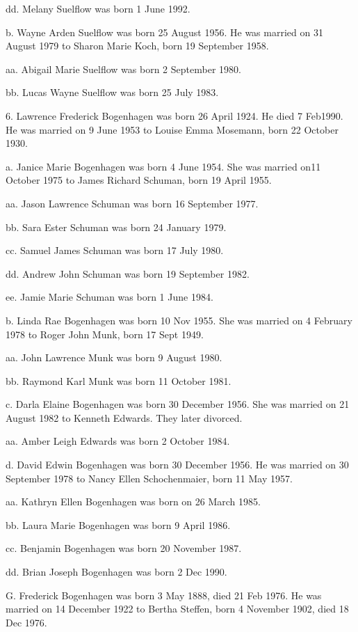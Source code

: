 \documentclass[a4paper]{article}
\begin{document}
dd. Melany Suelflow was born 1 June 1992.

b. Wayne Arden Suelflow was born 25 August 1956.  He was married on 31 August 1979 to Sharon Marie Koch, born 19 September 1958.

aa. Abigail Marie Suelflow was born 2 September 1980.

bb. Lucas Wayne Suelflow was born 25 July 1983.

6. Lawrence Frederick Bogenhagen was born 26 April 1924.  He died 7 Feb1990. He was married on 9 June 1953 to Louise Emma Mosemann, born 22 October 1930.

a. Janice Marie Bogenhagen was born 4 June 1954.  She was married on11 October 1975 to James Richard Schuman,  born 19 April 1955.

aa. Jason Lawrence Schuman was born 16 September 1977.

bb. Sara Ester Schuman was born 24 January 1979.

cc. Samuel James Schuman was born 17 July 1980. 

dd. Andrew John Schuman was born 19 September 1982.

ee. Jamie Marie Schuman was born 1 June 1984. 

b. Linda Rae Bogenhagen was born 10 Nov 1955.  She was married on 4 February 1978 to Roger John Munk, born 17 Sept 1949.

aa. John Lawrence Munk was born 9 August 1980.

bb. Raymond Karl Munk was born 11 October 1981.

c. Darla Elaine Bogenhagen was born 30 December 1956. She was married on 21 August 1982 to Kenneth Edwards.  They later divorced.

aa. Amber Leigh Edwards was born 2 October 1984.

d. David Edwin Bogenhagen was born 30 December 1956.  He was married on 30 September 1978 to Nancy Ellen Schochenmaier, born 11 May 1957.

aa. Kathryn Ellen Bogenhagen was born on 26 March 1985.

bb. Laura Marie Bogenhagen was born 9 April 1986.

cc. Benjamin Bogenhagen was born 20 November 1987.

dd. Brian Joseph Bogenhagen was born 2 Dec 1990.

G. Frederick Bogenhagen was born 3 May 1888, died 21 Feb 1976.  He was married on 14 December 1922 to Bertha Steffen, born 4 November 1902, died 18 Dec 1976.
\end{document}
